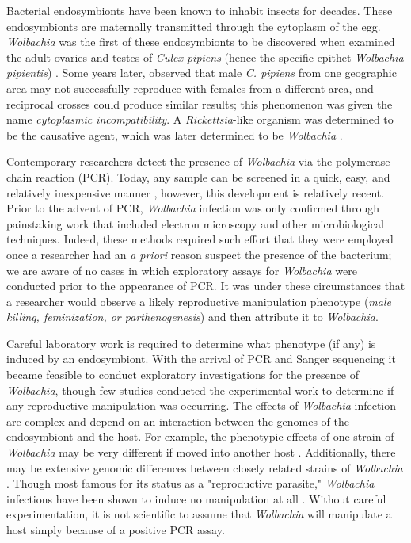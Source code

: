 \documentclass{frontiersSCNS} %
\begin{document}
Bacterial endosymbionts have been known to inhabit insects for decades. These endosymbionts are maternally transmitted through the cytoplasm of the egg. \textit{Wolbachia} was the first of these endosymbionts to be discovered when \citet{Hertig:1924wy} examined the adult ovaries and testes of \textit{Culex pipiens} (hence the specific epithet \textit{Wolbachia pipientis}) \citet{Hertig:1936}. Some years later, \citet{Yen:1971tc} observed that male \textit{C. pipiens} from one geographic area may not successfully reproduce with females from a different area, and reciprocal crosses could produce similar results; this phenomenon was given the name \textit{cytoplasmic incompatibility}. A \textit{Rickettsia}-like organism was determined to be the causative agent, which was later determined to be \textit{Wolbachia} \citep{Yen:1973vx}.

Contemporary researchers detect the presence of \textit{Wolbachia} via the polymerase chain reaction (PCR). Today, any sample can be screened in a quick, easy, and relatively inexpensive manner \citep{Baldo:2006p7025,Simoes:2011p11073}, however, this development is relatively recent. Prior to the advent of PCR, \textit{Wolbachia} infection was only confirmed through painstaking work that included electron microscopy and other microbiological techniques. Indeed, these methods required such effort that they were employed once a researcher had an \textit{a priori} reason suspect the presence of the bacterium; we are aware of no cases in which exploratory assays for \textit{Wolbachia} were conducted prior to the appearance of PCR. It was under these circumstances that a researcher would observe a likely reproductive manipulation phenotype (\emph{male killing, feminization, \emph{or} parthenogenesis}) and then attribute it to \textit{Wolbachia}.

Careful laboratory work is required to determine what phenotype (if any) is induced by an endosymbiont. With the arrival of PCR and Sanger sequencing it became feasible to conduct exploratory investigations for the presence of \textit{Wolbachia}, though few studies conducted the experimental work to determine if any reproductive manipulation was occurring. The effects of \textit{Wolbachia} infection are complex and depend on an interaction between the genomes of the endosymbiont and the host. For example, the phenotypic effects of one strain of \textit{Wolbachia} may be very different if moved into another host \citep{Rigaud:2001fv,Hoffmann:2011p11474}. Additionally, there may be extensive genomic differences between closely related strains of \textit{Wolbachia} \citep{Ishmael:2009p8257}. Though most famous for its status as a "reproductive parasite," \textit{Wolbachia} infections have been shown to induce no manipulation at all \citep{Hamm:2014cv,Zhang:2010jl,Zhang:2013eo}. Without careful experimentation, it is not scientific to assume that \textit{Wolbachia} will manipulate a host simply because of a positive PCR assay. 
\end{document}
